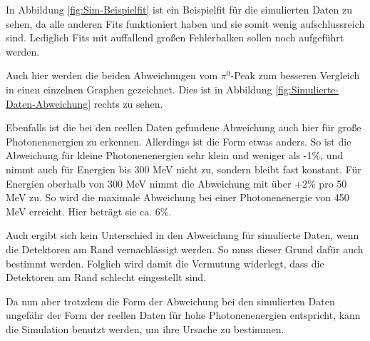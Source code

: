 \documentclass[a4paper,11pt,oneside,final,german,openbib,pdftex]{scrbook}
\begin{document}
{In Abbildung \ref{fig:Sim-Beispielfit} ist ein Beispielfit f\"ur die simulierten Daten zu sehen, da alle anderen Fits funktioniert haben und sie somit wenig aufschlussreich sind. Lediglich Fits mit auffallend gro{\ss}en Fehlerbalken sollen noch aufgef\"uhrt werden. 

Auch hier werden die beiden Abweichungen vom $\pi^0$-Peak zum besseren Vergleich in einen einzelnen Graphen gezeichnet. Dies ist in Abbildung \ref{fig:Simulierte-Daten-Abweichung} rechts zu sehen.

Ebenfalls ist die bei den reellen Daten gefundene Abweichung auch hier für große Photonenenergien zu erkennen. Allerdings ist die Form etwas anders. So ist die Abweichung f\"ur kleine Photonenenergien sehr klein und weniger als -1\%, und nimmt auch f\"ur Energien bis 300 MeV nicht zu, sondern bleibt fast konstant. F\"ur Energien oberhalb von 300 MeV nimmt die Abweichung mit \"uber +2\% pro 50 MeV zu. So wird die maximale Abweichung bei einer Photonenenergie von 450 MeV erreicht. Hier betr\"agt sie ca. 6\%. 

Auch ergibt sich kein Unterschied in den Abweichung für simulierte Daten, wenn die Detektoren am Rand vernachlässigt werden. So muss dieser Grund dafür auch bestimmt werden. Folglich wird damit die Vermutung widerlegt, dass die Detektoren am Rand schlecht eingestellt sind.



Da nun aber trotzdem die Form der Abweichung bei den simulierten Daten ungefähr der Form der reellen Daten für hohe Photonenenergien entspricht, kann die Simulation benutzt werden, um ihre Ursache zu bestimmen.


}
\end{document}
